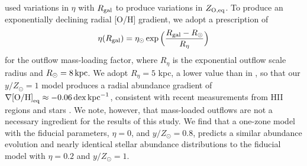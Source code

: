 \documentclass[twocolumn,twocolappendix,linenumbers]{aastex631}
\newcommand{\mathOH}{{\rm [O/H]}}
\newcommand{\yZ}[1]{$y/Z_\odot=#1$}
\newcommand{\kpc}{\,{\rm kpc}}
\begin{document}
\citet{johnson_milky_2024} used variations in $\eta$ with $R_{\rm gal}$ to produce variations in $Z_{\rm O,eq}$.
To produce an exponentially declining radial [O/H] gradient, we adopt a prescription of
\begin{equation}
    \eta(R_{\rm gal}) = \eta_\odot \exp\Big(\frac{R_{\rm gal}-R_\odot}{R_\eta}\Big)
\end{equation}
for the outflow mass-loading factor,
where $R_\eta$ is the exponential outflow scale radius and $R_\odot=8\kpc$. We adopt $R_\eta=5$ kpc, a lower value than in \citet{johnson_milky_2024}, so that our $y/Z_\odot=1$ model produces a radial abundance gradient of $\nabla\mathOH_{\rm eq}\approx-0.06\,{\rm dex}\kpc^{-1}$, consistent with recent measurements from HII regions \citep{mendez-delgado_gradients_2022} and stars \citep{myers_open_2022,johnson_milky_2024}. We note, however, that mass-loaded outflows are not a necessary ingredient for the results of this study. We find that a one-zone model with the fiducial parameters, $\eta=0$, and \yZ{0.8}, predicts a similar abundance evolution and nearly identical stellar abundance distributions to the fiducial model with $\eta=0.2$ and \yZ{1}.


\end{document}
